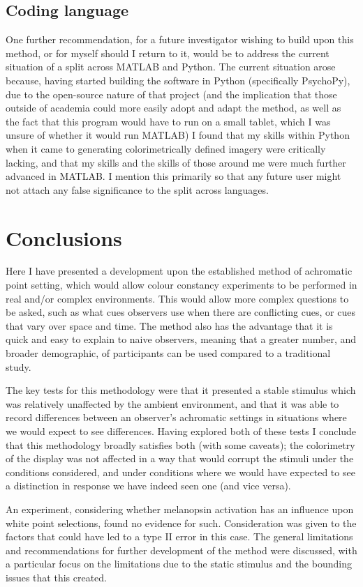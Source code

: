 \subsection{Coding language}

One further recommendation, for a future investigator wishing to build upon this method, or for myself should I return to it, would be to address the current situation of a split across MATLAB and Python. The current situation arose because, having started building the software in Python (specifically PsychoPy), due to the open-source nature of that project (and the implication that those outside of academia could more easily adopt and adapt the method, as well as the fact that this program would have to run on a small tablet, which I was unsure of whether it would run MATLAB) I found that my skills within Python when it came to generating colorimetrically defined imagery were critically lacking, and that my skills and the skills of those around me were much further advanced in MATLAB. I mention this primarily so that any future user might not attach any false significance to the split across languages.

\section{Conclusions}

Here I have presented a development upon the established method of achromatic point setting, which would allow colour constancy experiments to be performed in real and/or complex environments. This would allow more complex questions to be asked, such as what cues observers use when there are conflicting cues, or cues that vary over space and time.
The method also has the advantage that it is quick and easy to explain to naive observers, meaning that a greater number, and broader demographic, of participants can be used compared to a traditional study.

The key tests for this methodology were that it presented a stable stimulus which was relatively unaffected by the ambient environment, and that it was able to record differences between an observer's achromatic settings in situations where we would expect to see differences. Having explored both of these tests I conclude that this methodology broadly satisfies both (with some caveats); the colorimetry of the display was not affected in a way that would corrupt the stimuli under the conditions considered, and under conditions where we would have expected to see a distinction in response we have indeed seen one (and vice versa).

An experiment, considering whether melanopsin activation has an influence upon white point selections, found no evidence for such. Consideration was given to the factors that could have led to a type II error in this case.
The general limitations and recommendations for further development of the method were discussed, with a particular focus on the limitations due to the static stimulus and the bounding issues that this created.




